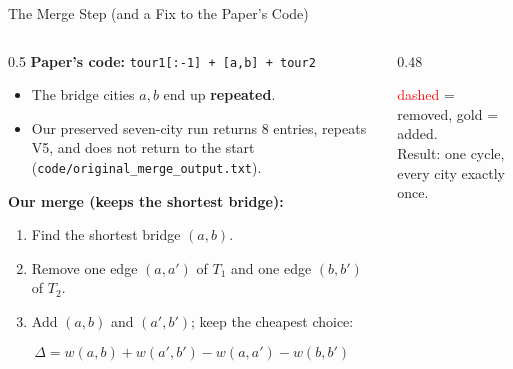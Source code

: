 \begin{frame}{The Merge Step (and a Fix to the Paper's Code)}
  \begin{columns}[T]
    \begin{column}{0.5\textwidth}
      \small
      \textbf{Paper's code:} \texttt{tour1[:-1] + [a,b] + tour2}
      \begin{itemize}
        \item The bridge cities $a, b$ end up \textbf{repeated}.
          \item Our preserved seven-city run returns 8 entries, repeats V5, and does not return to the start
            (\texttt{code/original\_merge\_output.txt}).
      \end{itemize}
      \medskip
      \textbf{Our merge (keeps the shortest bridge):}
      \begin{enumerate}
        \item Find the shortest bridge $(a,b)$.
        \item Remove one edge $(a,a')$ of $T_1$ and one edge $(b,b')$ of $T_2$.
        \item Add $(a,b)$ and $(a',b')$; keep the cheapest choice:
      \end{enumerate}
      \[ \Delta = w(a,b) + w(a',b') - w(a,a') - w(b,b') \]
    \end{column}
    \begin{column}{0.48\textwidth}
      \centering

      \scriptsize \textcolor{red}{dashed} = removed, \textcolor{gold!80!black}{gold} = added. \\
      Result: one cycle, every city exactly once.
    \end{column}
  \end{columns}
\end{frame}


